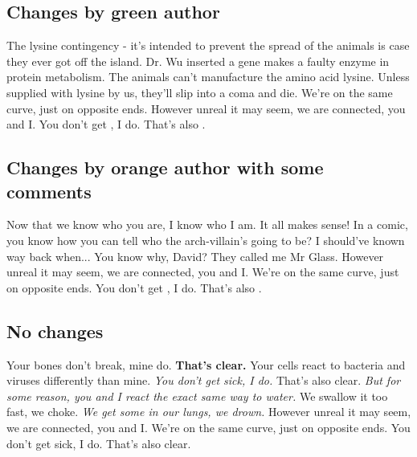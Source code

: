 \documentclass[11pt, a4paper, notitlepage, english]{article}
\begin{document}
\subsection*{Changes by green author}

The lysine contingency - it's intended to prevent the spread of the animals is case they ever got off the island.
Dr. Wu inserted a gene  makes a  faulty enzyme in protein metabolism.
The animals can't manufacture the amino acid lysine.
Unless  supplied with lysine by us, they'll slip into a coma and die.
We're on the same curve, just on opposite ends.
However unreal it may seem, we are connected, you and I.
You don't get , I do.
That's also .

\subsection*{Changes by orange author with some comments}

Now that we know who you are, I know who I am.
It all makes sense!
In a comic, you know how you can tell who the arch-villain's going to be?
I should've known way back when...
You know why, David?
They called me Mr Glass.
However unreal it may seem, we are connected, you and I.
We're on the same curve, just on opposite ends.
You don't get , I do.
That's also .

\subsection*{No changes}

Your bones don't break, mine do.
\textbf{That's clear.}
Your cells react to bacteria and viruses differently than mine.
\textsl{You don't get sick, I do.}
That's also clear.
\textit{But for some reason, you and I react the exact same way to water.}
We swallow it too fast, we choke.
\emph{We get some in our lungs, we drown.}
However unreal it may seem, we are connected, you and I.
We're on the same curve, just on opposite ends.
You don't get sick, I do.
That's also clear.
\end{document}
